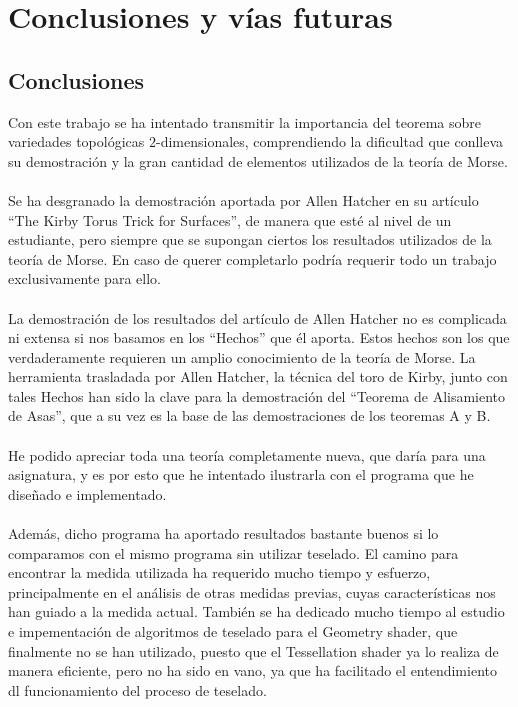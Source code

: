%


\chapter*{Conclusiones y vías futuras}

\section*{Conclusiones}
Con este trabajo se ha intentado transmitir la importancia del teorema sobre variedades topológicas $2$-dimensionales, comprendiendo la dificultad que conlleva su demostración y la gran cantidad de elementos utilizados de la teoría de Morse.\\
\\Se ha desgranado la demostración aportada por Allen Hatcher en su artículo ``The Kirby Torus Trick for Surfaces'', de manera que esté al nivel de un estudiante, pero siempre que se supongan ciertos los resultados utilizados de la teoría de Morse. En caso de querer completarlo podría requerir todo un trabajo exclusivamente para ello.\\
\\La demostración de los resultados del artículo de Allen Hatcher no es complicada ni extensa si nos basamos en los ``Hechos'' que él aporta. Estos hechos son los que verdaderamente requieren un amplio conocimiento de la teoría de Morse. La herramienta trasladada por Allen Hatcher, la técnica del toro de Kirby, junto con tales Hechos han sido la clave para la demostración del ``Teorema de Alisamiento de Asas'', que a su vez es la base de las demostraciones de los teoremas A y B.\\
\\He podido apreciar toda una teoría completamente nueva, que daría para una asignatura, y es por esto que he intentado ilustrarla con el programa que he diseñado e implementado.\\
\\Además, dicho programa ha aportado resultados bastante buenos si lo comparamos con el mismo programa sin utilizar teselado. El camino para encontrar la medida utilizada ha requerido mucho tiempo y esfuerzo, principalmente en el análisis de otras medidas previas, cuyas características nos han guiado a la medida actual. También se ha dedicado mucho tiempo al estudio e impementación de algoritmos de teselado para el Geometry shader, que finalmente no se han utilizado, puesto que el Tessellation shader ya lo realiza de manera eficiente, pero no ha sido en vano, ya que ha facilitado el entendimiento dl funcionamiento del proceso de teselado.\\
